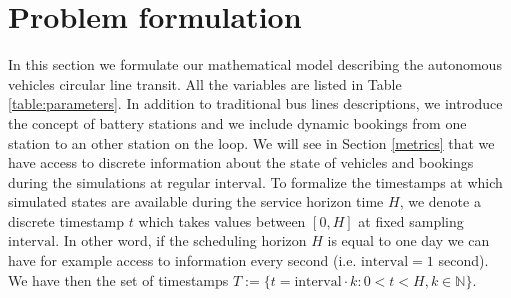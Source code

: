 \documentclass[12pt,a4paper]{article}
\begin{document}
\section{Problem formulation}\label{formulation}
In this section we formulate our mathematical model describing the autonomous vehicles circular line transit. All the variables are listed in Table \ref{table:parameters}. In addition to traditional bus lines descriptions, we introduce the concept of battery stations and we include dynamic bookings from one station to an other station on the loop. We will see in Section \ref{metrics} that we have access to discrete information about the state of vehicles and bookings during the simulations at regular $\text{interval}$. To formalize the timestamps at which simulated states are available during the service horizon time $H$, we denote a discrete timestamp $t$ which takes values between $[0, H]$ at fixed sampling $\text{interval}$. In other word, if the scheduling horizon $H$ is equal to one day we can have for example access to information every second (i.e. $\text{interval} = 1$ second). We have then the set of timestamps $T :=\{t = \text{interval} \cdot k:  0 < t < H, k \in \mathbb{N}\}$.
\end{document}
